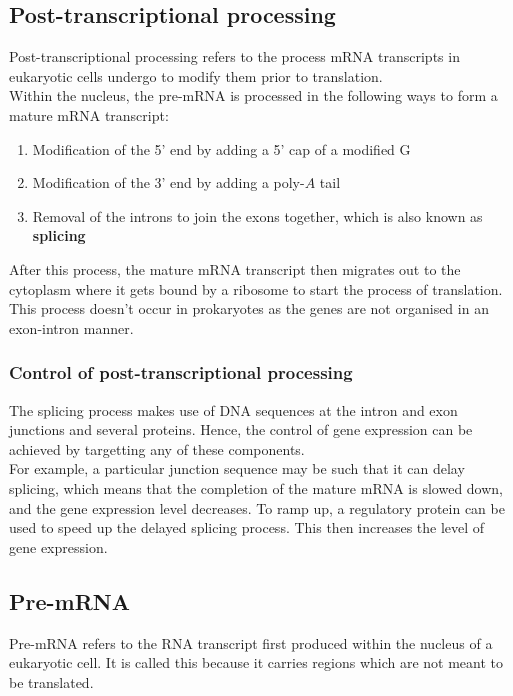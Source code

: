 \documentclass[11pt]{article}
\begin{document}
\subsection{Post-transcriptional processing}
\label{sec:orgf52c940}
Post-transcriptional processing refers to the process mRNA transcripts in eukaryotic cells undergo to modify them prior to translation.
\\[0pt]

Within the nucleus, the pre-mRNA is processed in the following ways to form a mature mRNA transcript:
\begin{enumerate}
\item Modification of the 5' end by adding a 5' cap of a modified G
\item Modification of the 3' end by adding a poly-\(A\) tail
\item Removal of the introns to join the exons together, which is also known as \textbf{splicing}
\end{enumerate}

After this process, the mature mRNA transcript then migrates out to the cytoplasm where it gets bound by a ribosome to start the process of translation.
\\[0pt]

This process doesn't occur in prokaryotes as the genes are not organised in an exon-intron manner.

\subsubsection{Control of post-transcriptional processing}
\label{sec:org32b6d5c}
The splicing process makes use of DNA sequences at the intron and exon junctions and several proteins. Hence, the control of gene expression can be achieved by targetting any of these components.
\\[0pt]

For example, a particular junction sequence may be such that it can delay splicing, which means that the completion of the mature mRNA is slowed down, and the gene expression level decreases. To ramp up, a regulatory protein can be used to speed up the delayed splicing process. This then increases the level of gene expression.

\subsection{Pre-mRNA}
\label{sec:org2aaac97}
Pre-mRNA refers to the RNA transcript first produced within the nucleus of a eukaryotic cell. It is called this because it carries regions which are not meant to be translated.
\end{document}
